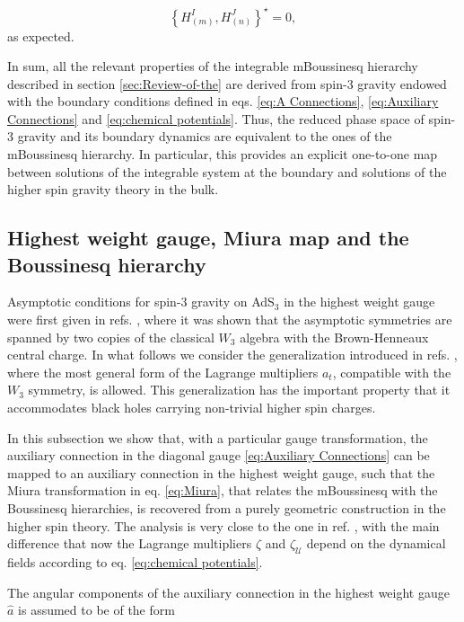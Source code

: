 \documentclass[letterpaper,11pt,oneside]{book}
\begin{document}
\[
\left\{ H_{\left(m\right)}^{I},H_{\left(n\right)}^{J}\right\} ^{\star}=0,
\]
as expected.

In sum, all the relevant properties of the integrable mBoussinesq
hierarchy described in section \ref{sec:Review-of-the} are derived
from spin-3 gravity endowed with the boundary conditions defined in
eqs. \eqref{eq:A Connections}, \eqref{eq:Auxiliary Connections}
and \eqref{eq:chemical potentials}. Thus, the reduced phase space
of spin-3 gravity and its boundary dynamics are equivalent to the
ones of the mBoussinesq hierarchy. In particular, this provides an
explicit one-to-one map between solutions of the integrable system
at the boundary and solutions of the higher spin gravity theory in
the bulk.

\subsection{Highest weight gauge, Miura map and the Boussinesq hierarchy\label{subsec:Relation-with-the}}

Asymptotic conditions for spin-3 gravity on AdS$_{3}$ in the highest
weight gauge were first given in refs. \cite{Campoleoni:2010zq,Henneaux:2010xg},
where it was shown that the asymptotic symmetries are spanned by two
copies of the classical $W_{3}$ algebra with the Brown-Henneaux central
charge. In what follows we consider the generalization introduced
in refs. \cite{Henneaux:2013dra,Bunster:2014mua}, where the most
general form of the Lagrange multipliers $a_{t}$, compatible with
the $W_{3}$ symmetry, is allowed. This generalization has the important
property that it accommodates black holes carrying non-trivial higher
spin charges.

In this subsection we show that, with a particular gauge transformation,
the auxiliary connection in the diagonal gauge \eqref{eq:Auxiliary Connections}
can be mapped to an auxiliary connection in the highest weight gauge,
such that the Miura transformation in eq. \eqref{eq:Miura}, that
relates the mBoussinesq with the Boussinesq hierarchies, is recovered
from a purely geometric construction in the higher spin theory. The
analysis is very close to the one in ref. \cite{Grumiller:2016kcp},
with the main difference that now the Lagrange multipliers $\zeta$
and $\zeta_{\mathcal{U}}$ depend on the dynamical fields according
to eq. \eqref{eq:chemical potentials}.

The angular components of the auxiliary connection in the highest
weight gauge $\hat{a}$ is assumed to be of the form
\end{document}
